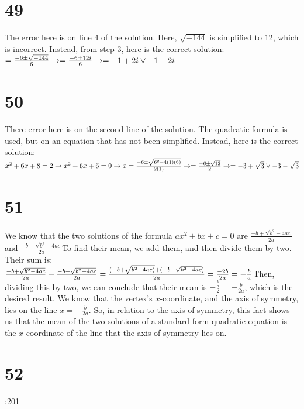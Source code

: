 \section*{49}
The error here is on line 4 of the solution. Here, $\sqrt{-144}$ is simplified to $12$, which is incorrect. Instead, from step 3, here is the correct
solution: $=\frac{-6\pm\sqrt{-144}}{6}\newline\rightarrow =\frac{-6\pm 12i}{6}\newline\rightarrow =-1+2i\vee -1-2i$

\section*{50}
There error here is on the second line of the solution. The quadratic formula is used, but on an equation that has not been simplified. Instead,
here is the correct solution: $x^2+6x+8=2\newline\rightarrow x^2+6x+6=0\newline\rightarrow x=\frac{-6\pm\sqrt{6^2-4(1)(6)}}{2(1)}\newline\rightarrow
=\frac{-6\pm\sqrt{12}}{2}\newline\rightarrow =-3+\sqrt{3}\vee -3-\sqrt{3}$

\section*{51}
We know that the two solutions of the formula $ax^2+bx+c=0$ are $\frac{-b+\sqrt{b^2-4ac}}{2a}$ and $\frac{-b-\sqrt{b^2-4ac}}{2a}$\newline To find their
mean, we add them, and then divide them by two. Their sum is:\newline $\frac{-b+\sqrt{b^2-4ac}}{2a}+\frac{-b-\sqrt{b^2-4ac}}{2a}\newline =
\frac{(-b+\sqrt{b^2-4ac)}+(-b-\sqrt{b^2-4ac})}{2a}=\frac{-2b}{2a}=-\frac{b}{a}$\newline Then, dividing this by two, we can conclude that their mean is
$-\frac{\frac{b}{a}}{2}=-\frac{b}{2a}$, which is the desired result. We know that the vertex's $x$-coordinate, and the axis of symmetry, lies on
the line $x=-\frac{b}{2a}$. So, in relation to the axis of symmetry, this fact shows us that the mean of the two solutions of a standard form
quadratic equation is the $x$-coordinate of the line that the axis of symmetry lies on.

\section*{52}
:201


